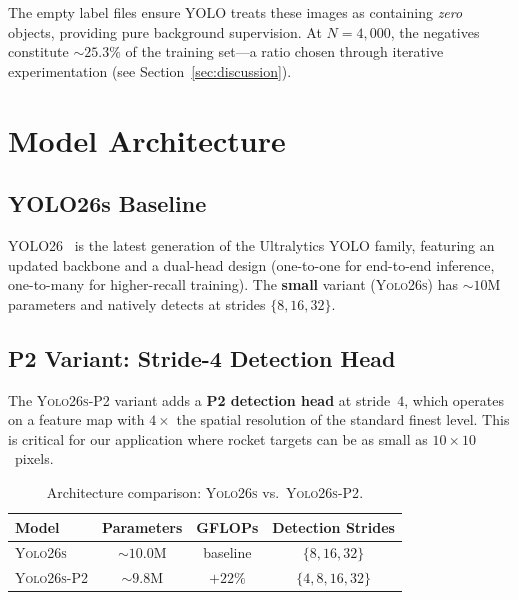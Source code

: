 \documentclass[12pt, titlepage]{article}
\begin{document}
The empty label files ensure YOLO treats these images as containing \emph{zero}
objects, providing pure background supervision. At $N=4{,}000$, the negatives
constitute $\sim\!25.3\%$ of the training set---a ratio chosen through
iterative experimentation (see Section~\ref{sec:discussion}).

\section{Model Architecture}
\label{sec:arch}

\subsection{YOLO26s Baseline}

YOLO26~\citep{ultralytics2025yolo} is the latest generation of the Ultralytics
YOLO family, featuring an updated backbone and a dual-head design (one-to-one
for end-to-end inference, one-to-many for higher-recall training). The
\textbf{small} variant (\textsc{Yolo26s}) has ${\sim}10$M parameters and
natively detects at strides $\{8, 16, 32\}$.

\subsection{P2 Variant: Stride-4 Detection Head}

The \textsc{Yolo26s-P2} variant adds a \textbf{P2 detection head} at
stride~$4$, which operates on a feature map with $4{\times}$ the spatial
resolution of the standard finest level. This is critical for our application
where rocket targets can be as small as $10{\times}10$~pixels.

\begin{table}[h]
  \centering
  \caption{Architecture comparison: \textsc{Yolo26s} vs.\ \textsc{Yolo26s-P2}.}
  \label{tab:arch}
  \begin{tabular}{@{}lccc@{}}
    \toprule
    \textbf{Model}      & \textbf{Parameters} & \textbf{GFLOPs} & \textbf{Detection Strides} \\
    \midrule
    \textsc{Yolo26s}    & ${\sim}10.0$M       & baseline        & $\{8, 16, 32\}$            \\
    \textsc{Yolo26s-P2} & ${\sim}9.8$M        & $+22\%$         & $\{4, 8, 16, 32\}$         \\
    \bottomrule
  \end{tabular}
\end{table}
\end{document}
